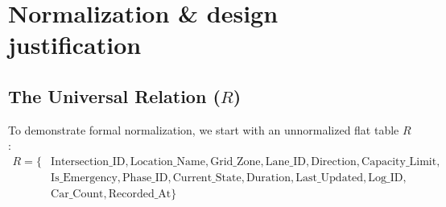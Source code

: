 \documentclass[11pt,a4paper]{article}
\begin{document}
\section{Normalization \& design justification}

\subsection{The Universal Relation ($R$)}
To demonstrate formal normalization, we start with an unnormalized flat table $R$:
\begin{align*}
R = \{ & \text{Intersection\_ID}, \text{Location\_Name}, \text{Grid\_Zone}, \text{Lane\_ID}, \text{Direction}, \text{Capacity\_Limit}, \\
       & \text{Is\_Emergency}, \text{Phase\_ID}, \text{Current\_State}, \text{Duration}, \text{Last\_Updated}, \text{Log\_ID}, \\
       & \text{Car\_Count}, \text{Recorded\_At} \}
\end{align*}
\end{document}
